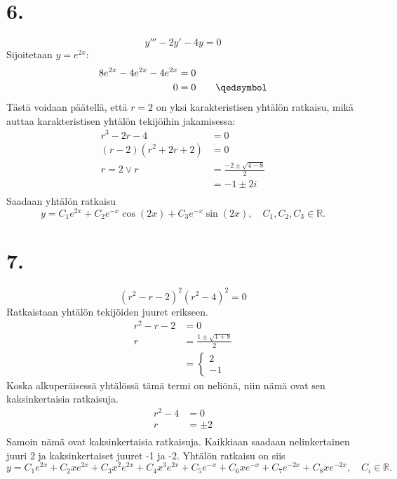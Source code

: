\documentclass{article}
\begin{document}
\section*{6.}

\[
  y''' - 2y' - 4y = 0
\]
Sijoitetaan $y = e^{2x}$:
\begin{align*}
  8e^{2x} - 4e^{2x} - 4e^{2x} &= 0 \\
  0 &= 0 \qquad \qedsymbol \\
\end{align*}
Tästä voidaan päätellä, että $r = 2$ on yksi karakteristisen yhtälön ratkaisu,
mikä auttaa karakteristisen yhtälön tekijöihin jakamisessa:
\begin{align*}
  r^3 - 2r - 4 &= 0 \\
  (r-2)(r^2 + 2r + 2) &= 0 \\
  r = 2 \vee r &= \frac{-2 \pm \sqrt{4 - 8}}{2} \\
               &= -1 \pm 2i \\
\end{align*}
Saadaan yhtälön ratkaisu
\[
  y = C_1e^{2x} + C_2e^{-x}\cos(2x) + C_3e^{-x}\sin(2x), \quad C_1,C_2,C_3 \in \mathbb{R}.
\]

\section*{7.}

\[
  (r^2 - r - 2)^2(r^2 - 4)^2 = 0
\]
Ratkaistaan yhtälön tekijöiden juuret erikseen.
\begin{align*}
  r^2 - r - 2 &= 0 \\
  r &= \frac{1 \pm \sqrt{1 + 8}}{2} \\
    &= \begin{cases} 2 \\ -1 \end{cases}
\end{align*}
Koska alkuperäisessä yhtälössä tämä termi on neliönä, niin nämä ovat sen
kaksinkertaisia ratkai\-suja.
\begin{align*}
  r^2 - 4 &= 0 \\
  r &= \pm 2 \\
\end{align*}
Samoin nämä ovat kaksinkertaisia ratkaisuja. Kaikkiaan saadaan
nelinkertainen juuri 2 ja kaksin\-kertaiset juuret -1 ja -2.
Yhtälön ratkaisu on siis
\[
  y = C_1e^{2x} + C_2xe^{2x} + C_3x^2e^{2x} + C_4x^3e^{2x}
    + C_5e^{-x} + C_6xe^{-x} + C_7e^{-2x} + C_8xe^{-2x},
    \quad C_i \in \mathbb{R}.
\]
\end{document}
